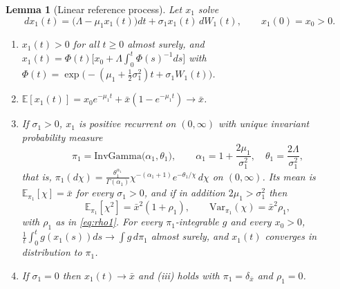\documentclass{article}
\newtheorem{lemma}{Lemma}[section]
\begin{document}
\begin{lemma}[Linear reference process]\label{lem4}
Let $x_1$ solve
\begin{equation}\label{x1-eq}
dx_1(t)=\big(\Lambda-\mu_1x_1(t)\big)dt+\sigma_1x_1(t)\,dW_1(t),\qquad x_1(0)=x_0>0 .
\end{equation}
\begin{enumerate}
\item[(i)] $x_1(t)>0$ for all $t\ge0$ almost surely, and
$x_1(t)=\Phi(t)\big[x_0+\Lambda\int_0^t\Phi(s)^{-1}ds\big]$ with $\Phi(t)=\exp\big(-(\mu_1+\tfrac12\sigma_1^2)t+\sigma_1W_1(t)\big)$.
\item[(ii)] $\mathbb{E}[x_1(t)]=x_0e^{-\mu_1t}+\bar x(1-e^{-\mu_1t})\to\bar x$.
\item[(iii)] If $\sigma_1>0$, $x_1$ is positive recurrent on $(0,\infty)$ with unique invariant probability measure
\begin{equation}\label{eq:invgamma}
\pi_1=\mathrm{InvGamma}\big(\alpha_1,\theta_1\big),\qquad \alpha_1=1+\frac{2\mu_1}{\sigma_1^2},\quad \theta_1=\frac{2\Lambda}{\sigma_1^2},
\end{equation}
that is, $\pi_1(d\chi)=\frac{\theta_1^{\alpha_1}}{\Gamma(\alpha_1)}\chi^{-(\alpha_1+1)}e^{-\theta_1/\chi}\,d\chi$ on $(0,\infty)$. Its mean is $\mathbb{E}_{\pi_1}[\chi]=\bar x$ for every $\sigma_1>0$, and if in addition $2\mu_1>\sigma_1^2$ then
\begin{equation}\label{eq:secondmoment}
\mathbb{E}_{\pi_1}[\chi^2]=\bar x^2(1+\rho_1),\qquad \mathrm{Var}_{\pi_1}(\chi)=\bar x^2\rho_1,
\end{equation}
with $\rho_1$ as in \eqref{eq:rho1}. For every $\pi_1$-integrable $g$ and every $x_0>0$, $\frac1t\int_0^tg(x_1(s))ds\to\int g\,d\pi_1$ almost surely, and $x_1(t)$ converges in distribution to $\pi_1$.
\item[(iv)] If $\sigma_1=0$ then $x_1(t)\to\bar x$ and (iii) holds with $\pi_1=\delta_{\bar x}$ and $\rho_1=0$.
\end{enumerate}
\end{lemma}
\end{document}
